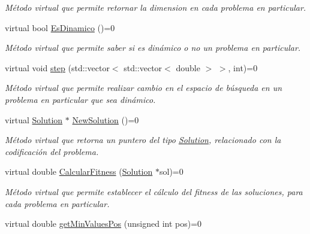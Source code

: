 \begin{DoxyCompactItemize}
\begin{DoxyCompactList}\small\item\em Método virtual que permite retornar la dimension en cada problema en particular. \end{DoxyCompactList}\item 
\hypertarget{class_problem_a481dc3e5869cf95b3c539d552e8eeb50}{virtual bool \hyperlink{class_problem_a481dc3e5869cf95b3c539d552e8eeb50}{Es\+Dinamico} ()=0}\label{class_problem_a481dc3e5869cf95b3c539d552e8eeb50}

\begin{DoxyCompactList}\small\item\em Método virtual que permite saber si es dinámico o no un problema en particular. \end{DoxyCompactList}\item 
\hypertarget{class_problem_a0c7025eb5127b1eda7988cceadc00da6}{virtual void \hyperlink{class_problem_a0c7025eb5127b1eda7988cceadc00da6}{step} (std\+::vector$<$ std\+::vector$<$ double $>$ $>$, int)=0}\label{class_problem_a0c7025eb5127b1eda7988cceadc00da6}

\begin{DoxyCompactList}\small\item\em Método virtual que permite realizar cambio en el espacio de búsqueda en un problema en particular que sea dinámico. \end{DoxyCompactList}\item 
\hypertarget{class_problem_a4b9787b3945dbec08e402c0cfd0f646b}{virtual \hyperlink{class_solution}{Solution} $\ast$ \hyperlink{class_problem_a4b9787b3945dbec08e402c0cfd0f646b}{New\+Solution} ()=0}\label{class_problem_a4b9787b3945dbec08e402c0cfd0f646b}

\begin{DoxyCompactList}\small\item\em Método virtual que retorna un puntero del tipo \hyperlink{class_solution}{Solution}, relacionado con la codificación del problema. \end{DoxyCompactList}\item 
\hypertarget{class_problem_adc6176be667576d08cf3e89b65e905f4}{virtual double \hyperlink{class_problem_adc6176be667576d08cf3e89b65e905f4}{Calcular\+Fitness} (\hyperlink{class_solution}{Solution} $\ast$sol)=0}\label{class_problem_adc6176be667576d08cf3e89b65e905f4}

\begin{DoxyCompactList}\small\item\em Método virtual que permite establecer el cálculo del fitness de las soluciones, para cada problema en particular. \end{DoxyCompactList}\item 
\hypertarget{class_problem_ad6a122249b93487f91a64837a056fa75}{virtual double \hyperlink{class_problem_ad6a122249b93487f91a64837a056fa75}{get\+Min\+Values\+Pos} (unsigned int pos)=0}\label{class_problem_ad6a122249b93487f91a64837a056fa75}


\end{DoxyCompactItemize}
